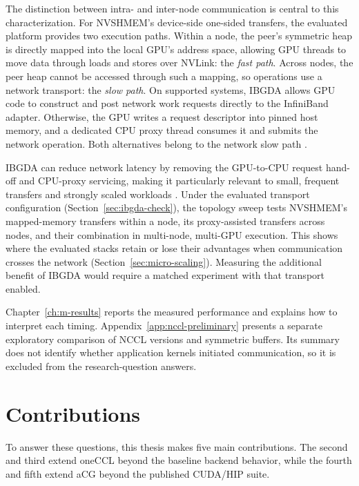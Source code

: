 The distinction between intra- and inter-node communication is central to this characterization. For NVSHMEM's device-side one-sided transfers, the evaluated platform provides two execution paths. Within a node, the peer's symmetric heap is directly mapped into the local GPU's address space, allowing GPU threads to move data through loads and stores over NVLink: the \emph{fast path}. Across nodes, the peer heap cannot be accessed through such a mapping, so operations use a network transport: the \emph{slow path}. On supported systems, \ac{IBGDA} allows GPU code to construct and post network work requests directly to the InfiniBand adapter. Otherwise, the GPU writes a request descriptor into pinned host memory, and a dedicated CPU proxy thread consumes it and submits the network operation. Both alternatives belong to the network slow path \cite{ma_demystifying_2026}.

IBGDA can reduce network latency by removing the GPU-to-CPU request hand-off and CPU-proxy servicing, making it particularly relevant to small, frequent transfers and strongly scaled workloads \cite{ma_demystifying_2026}. Under the evaluated transport configuration (Section~\ref{sec:ibgda-check}), the topology sweep tests NVSHMEM's mapped-memory transfers within a node, its proxy-assisted transfers across nodes, and their combination in multi-node, multi-GPU execution. This shows where the evaluated stacks retain or lose their advantages when communication crosses the network (Section~\ref{sec:micro-scaling}). Measuring the additional benefit of IBGDA would require a matched experiment with that transport enabled.

Chapter~\ref{ch:m-results} reports the measured performance and explains how to interpret each timing. Appendix~\ref{app:nccl-preliminary} presents a separate exploratory comparison of NCCL versions and symmetric buffers. Its summary does not identify whether application kernels initiated communication, so it is excluded from the research-question answers.

\section{Contributions}

To answer these questions, this thesis makes five main contributions. The second and third extend oneCCL beyond the baseline backend behavior, while the fourth and fifth extend aCG beyond the published CUDA/HIP suite.

